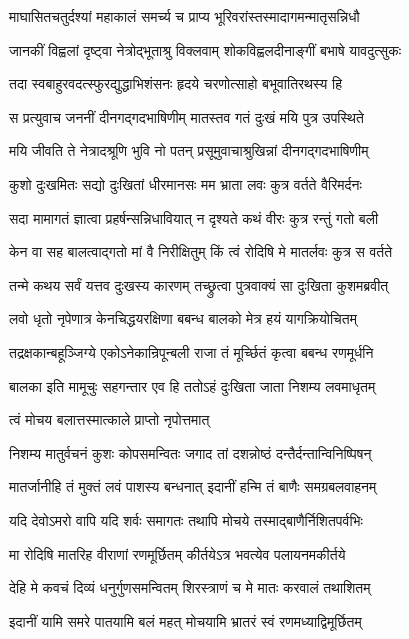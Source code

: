 \twolineshloka
{माघासितचतुर्दश्यां महाकालं समर्च्य च}
{प्राप्य भूरिवरांस्तस्मादागमन्मातृसन्निधौ}%

\twolineshloka
{जानकीं विह्वलां दृष्ट्वा नेत्रोद्भूताश्रु विक्लवाम्}
{शोकविह्वलदीनाङ्गीं बभाषे यावदुत्सुकः}%

\twolineshloka
{तदा स्वबाहुरवदत्स्फुरद्युद्धाभिशंसनः}
{हृदये चरणोत्साहो बभूवातिरथस्य हि}%

\twolineshloka
{स प्रत्युवाच जननीं दीनगद्गदभाषिणीम्}
{मातस्तव गतं दुःखं मयि पुत्र उपस्थिते}%

\twolineshloka
{मयि जीवति ते नेत्रादश्रूणि भुवि नो पतन्}
{प्रसूमुवाचाश्रुखिन्नां दीनगद्गदभाषिणीम्}%

\twolineshloka
{कुशो दुःखमितः सद्यो दुःखितां धीरमानसः}
{मम भ्राता लवः कुत्र वर्तते वैरिमर्दनः}%

\twolineshloka
{सदा मामागतं ज्ञात्वा प्रहर्षन्सन्निधावियात्}
{न दृश्यते कथं वीरः कुत्र रन्तुं गतो बली}%

\twolineshloka
{केन वा सह बालत्वाद्गतो मां वै निरीक्षितुम्}
{किं त्वं रोदिषि मे मातर्लवः कुत्र स वर्तते}%

\twolineshloka
{तन्मे कथय सर्वं यत्तव दुःखस्य कारणम्}
{तच्छ्रुत्वा पुत्रवाक्यं सा दुःखिता कुशमब्रवीत्}%

\twolineshloka
{लवो धृतो नृपेणात्र केनचिद्धयरक्षिणा}
{बबन्ध बालको मेत्र हयं यागक्रियोचितम्}%

\twolineshloka
{तद्रक्षकान्बहूञ्जिग्ये एकोऽनेकान्रिपून्बली}
{राजा तं मूर्च्छितं कृत्वा बबन्ध रणमूर्धनि}%

\twolineshloka
{बालका इति मामूचुः सहगन्तार एव हि}
{ततोऽहं दुःखिता जाता निशम्य लवमाधृतम्}%

त्वं मोचय बलात्तस्मात्काले प्राप्तो नृपोत्तमात्

\twolineshloka
{निशम्य मातुर्वचनं कुशः कोपसमन्वितः}
{जगाद तां दशन्नोष्ठं दन्तैर्दन्तान्विनिष्पिषन्}%


\twolineshloka
{मातर्जानीहि तं मुक्तं लवं पाशस्य बन्धनात्}
{इदानीं हन्मि तं बाणैः समग्रबलवाहनम्}%

\twolineshloka
{यदि देवोऽमरो वापि यदि शर्वः समागतः}
{तथापि मोचये तस्माद्बाणैर्निशितपर्वभिः}%

\twolineshloka
{मा रोदिषि मातरिह वीराणां रणमूर्छितम्}
{कीर्तयेऽत्र भवत्येव पलायनमकीर्तये}%

\twolineshloka
{देहि मे कवचं दिव्यं धनुर्गुणसमन्वितम्}
{शिरस्त्राणं च मे मातः करवालं तथाशितम्}%

\twolineshloka
{इदानीं यामि समरे पातयामि बलं महत्}
{मोचयामि भ्रातरं स्वं रणमध्याद्विमूर्छितम्}%

